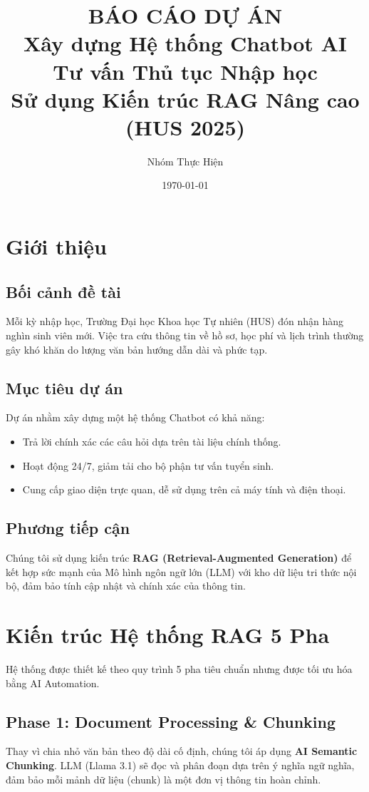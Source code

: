 \documentclass[12pt,a4paper]{report}
\title{
    \textbf{BÁO CÁO DỰ ÁN}\\
    \large Xây dựng Hệ thống Chatbot AI Tư vấn Thủ tục Nhập học\\
    Sử dụng Kiến trúc RAG Nâng cao (HUS 2025)
}
\author{Nhóm Thực Hiện}
\date{\today}
\begin{document}
\maketitle

\tableofcontents

\chapter{Giới thiệu}
\section{Bối cảnh đề tài}
Mỗi kỳ nhập học, Trường Đại học Khoa học Tự nhiên (HUS) đón nhận hàng nghìn sinh viên mới. Việc tra cứu thông tin về hồ sơ, học phí và lịch trình thường gây khó khăn do lượng văn bản hướng dẫn dài và phức tạp. 

\section{Mục tiêu dự án}
Dự án nhằm xây dựng một hệ thống Chatbot có khả năng:
\begin{itemize}
    \item Trả lời chính xác các câu hỏi dựa trên tài liệu chính thống.
    \item Hoạt động 24/7, giảm tải cho bộ phận tư vấn tuyển sinh.
    \item Cung cấp giao diện trực quan, dễ sử dụng trên cả máy tính và điện thoại.
\end{itemize}

\section{Phương tiếp cận}
Chúng tôi sử dụng kiến trúc \textbf{RAG (Retrieval-Augmented Generation)} để kết hợp sức mạnh của Mô hình ngôn ngữ lớn (LLM) với kho dữ liệu tri thức nội bộ, đảm bảo tính cập nhật và chính xác của thông tin.

\chapter{Kiến trúc Hệ thống RAG 5 Pha}
Hệ thống được thiết kế theo quy trình 5 pha tiêu chuẩn nhưng được tối ưu hóa bằng AI Automation.

\section{Phase 1: Document Processing \& Chunking}
Thay vì chia nhỏ văn bản theo độ dài cố định, chúng tôi áp dụng \textbf{AI Semantic Chunking}. LLM (Llama 3.1) sẽ đọc và phân đoạn dựa trên ý nghĩa ngữ nghĩa, đảm bảo mỗi mảnh dữ liệu (chunk) là một đơn vị thông tin hoàn chỉnh.
\end{document}
